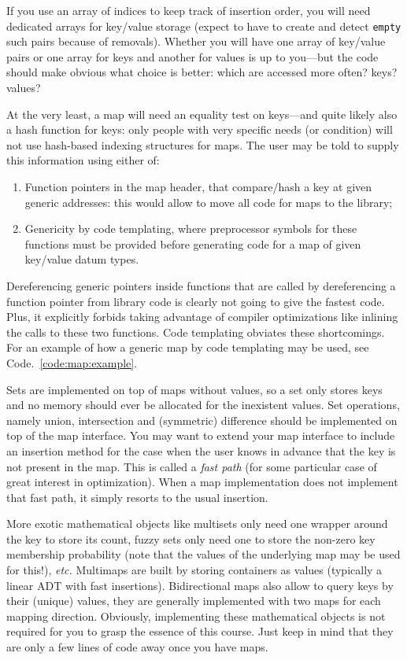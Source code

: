 If you use an array of indices to keep track of insertion order, you will need dedicated arrays for key/value storage (expect to have to create and detect \texttt{empty} such pairs because of removals). Whether you will have one array of key/value pairs or one array for keys and another for values is up to you---but the code should make obvious what choice is better: which are accessed more often? keys? values?

At the very least, a map will need an equality test on keys---and quite likely also a hash function for keys: only people with very specific needs (or condition) will not use hash-based indexing structures for maps. The user may be told to supply this information using either of:
\begin{enumerate}
\item Function pointers in the map header, that compare/hash a key at given generic addresses: this would allow to move all code for maps to the library;
\item Genericity by code templating, where preprocessor symbols for these functions must be provided before generating code for a map of given key/value datum types.
\end{enumerate}

Dereferencing generic pointers inside functions that are called by dereferencing a function pointer from library code is clearly not going to give the fastest code. Plus, it explicitly forbids taking advantage of compiler optimizations like inlining the calls to these two functions. Code templating obviates these shortcomings. For an example of how a generic map by code templating may be used, see Code.~\ref{code:map:example}. 

Sets are implemented on top of maps without values, so a set only stores keys and no memory should ever be allocated for the inexistent values. Set operations, namely union, intersection and (symmetric) difference should be implemented on top of the map interface. You may want to extend your map interface to include an insertion method for the case when the user knows in advance that the key is not present in the map. This is called a \textit{fast path} (for some particular case of great interest in optimization). When a map implementation does not implement that fast path, it simply resorts to the usual insertion.

More exotic mathematical objects like multisets only need one wrapper around the key to store its count, fuzzy sets only need one to store the non-zero key membership probability (note that the values of the underlying map may be used for this!), \textit{etc.} Multimaps are built by storing containers as values (typically a linear ADT with fast insertions). Bidirectional maps also allow to query keys by their (unique) values, they are generally implemented with two maps for each mapping direction. Obviously, implementing these mathematical objects is not required for you to grasp the essence of this course. Just keep in mind that they are only a few lines of code away once you have maps.


